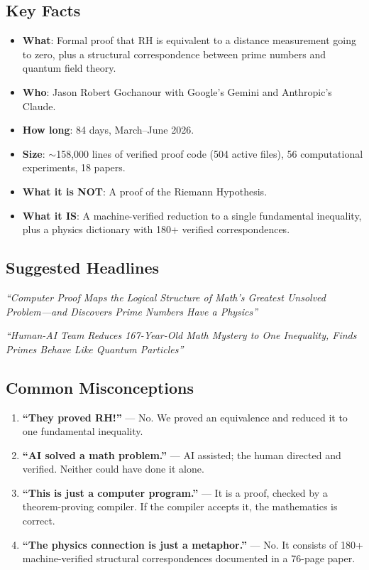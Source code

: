 \documentclass[11pt,a4paper]{article}
\begin{document}
\subsection{Key Facts}

\begin{itemize}
  \item \textbf{What}: Formal proof that RH is equivalent to a
    distance measurement going to zero, plus a structural
    correspondence between prime numbers and quantum field theory.
  \item \textbf{Who}: Jason Robert Gochanour with Google's Gemini
    and Anthropic's Claude.
  \item \textbf{How long}: 84 days, March--June 2026.
  \item \textbf{Size}: $\sim$158{,}000 lines of verified proof code
    (504 active files), 56 computational experiments, 18 papers.
  \item \textbf{What it is NOT}: A proof of the Riemann Hypothesis.
  \item \textbf{What it IS}: A machine-verified reduction to a single
    fundamental inequality, plus a physics dictionary with 180+
    verified correspondences.
\end{itemize}

\subsection{Suggested Headlines}

\emph{``Computer Proof Maps the Logical Structure of Math's Greatest
Unsolved Problem---and Discovers Prime Numbers Have a Physics''}

\emph{``Human-AI Team Reduces 167-Year-Old Math Mystery to One
Inequality, Finds Primes Behave Like Quantum Particles''}

\subsection{Common Misconceptions}

\begin{enumerate}
  \item \textbf{``They proved RH!''} --- No. We proved an equivalence
    and reduced it to one fundamental inequality.
  \item \textbf{``AI solved a math problem.''} --- AI assisted; the
    human directed and verified. Neither could have done it alone.
  \item \textbf{``This is just a computer program.''} --- It is a
    proof, checked by a theorem-proving compiler. If the compiler
    accepts it, the mathematics is correct.
  \item \textbf{``The physics connection is just a metaphor.''} ---
    No. It consists of 180+ machine-verified structural
    correspondences documented in a 76-page paper.
\end{enumerate}
\end{document}
